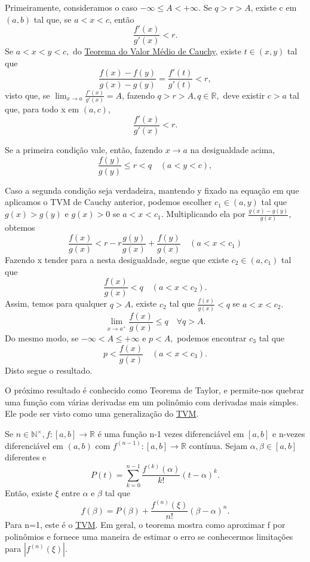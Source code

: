 \documentclass[analysis_notes.tex]{subfiles}
\begin{document}
\begin{proof*}
	Primeiramente, consideramos o caso \(-\infty\leq A < +\infty\). Se \(q > r > A\),
	existe c em \((a, b)\) tal que, se \(a < x < c\), então
	\[
		\frac{f'(x)}{g'(x)} < r.
	\]
	Se \(a < x < y < c,\) do \hyperlink{cauchy_mvt}{Teorema do Valor Médio de Cauchy}, existe
	\(t\in (x, y)\) tal que
	\[
		\frac{f(x) - f(y)}{g(x) - g(y)} = \frac{f'(t)}{g'(t)} < r,
	\]
	visto que, se \(\lim_{x\to a}\frac{f'(x)}{g'(x)} = A\), fazendo \(q > r > A, q\in \mathbb{R},\)
	deve existir \(c > a\) tal que, para todo x em \((a, c)\),
	\[
		\frac{f'(x)}{g'(x)} < r.
	\]

	Se a primeira condi\c cão vale, então, fazendo \(x\rightarrow a\) na desigualdade acima,
	\[
		\frac{f(y)}{g(y)}\leq r < q \quad (a < y < c),
	\]

	Caso a segunda condi\c cão seja verdadeira, mantendo y fixado na equa\c cão em que aplicamos o TVM de Cauchy anterior,
	podemos escolher \(c_{1}\in (a, y)\) tal que \(g(x) > g(y) \) e \(g(x) > 0\) se
	\(a < x < c_{1}.\) Multiplicando ela por \(\frac{g(x)-g(y)}{g(x)},\) obtemos
	\[
		\frac{f(x)}{g(x)} < r - r\frac{g(y)}{g(x)} + \frac{f(y)}{g(x)}\quad (a < x < c_{1})
	\]
	Fazendo x tender para a nesta desigualdade, segue que existe \(c_{2}\in (a, c_{1})\)
	tal que
	\[
		\frac{f(x)}{g(x)} < q\quad (a < x < c_{2}).
	\]
	Assim, temos para qualquer \(q > A\), existe \(c_{2}\) tal que \(\frac{f(x)}{g(x)} < q\) se \(a < x < c_{2}.\)
	\[
		\lim_{x\to a^{+}} \frac{f(x)}{g(x)}\leq q \quad\forall q > A.
	\]
	Do mesmo modo, se \(-\infty < A\leq +\infty\) e \(p < A,\) podemos encontrar
	\(c_{3}\) tal que
	\[
		p < \frac{f(x)}{g(x)}\quad (a < x < c_{3}).
	\]
	Disto segue o resultado. \qedsymbol
\end{proof*}
O próximo resultado é conhecido como Teorema de Taylor, e permite-nos quebrar
uma fun\c cão com várias derivadas em um polinômio com derivadas mais simples.
Ele pode ser visto como uma generaliza\c cão do \hyperlink{mean_value}{TVM}.
\hypertarget{taylor}{
	\begin{theorem*}
		Se \(n\in \mathbb{N}^{\times}, f:[a, b]\rightarrow \mathbb{R}\) é uma fun\c cão
		n-1 vezes diferenciável em \([a, b]\) e n-vezes diferenciável em \((a, b)\) com
		\(f^{(n-1)}:[a, b]\rightarrow \mathbb{R}\) contínua. Sejam \(\alpha , \beta \in[a, b]\) diferentes
		e
		\[
			P(t) = \sum\limits_{k=0}^{n-1}\frac{f^{(k)}(\alpha )}{k!}(t-\alpha )^{k}.
		\]
		Então, existe \(\xi\) entre \(\alpha  \) e \(\beta \) tal que
		\[
			f(\beta ) = P(\beta ) + \frac{f^{(n)}(\xi)}{n!}(\beta -\alpha )^{n}.
		\]
		Para n=1, este é o \hyperlink{mean_value}{TVM}. Em geral, o teorema mostra
		como aproximar f por polinômios e fornece uma maneira de estimar o erro
		se conhecermos limita\c cões para \(|f^{(n)}(\xi)|.\)
	\end{theorem*}}
\end{document}
